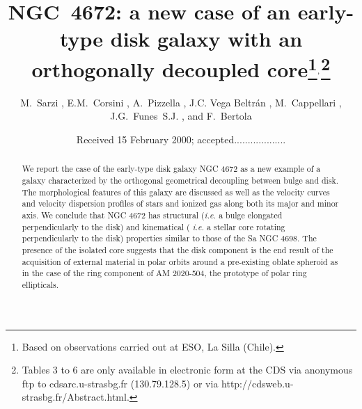 \documentclass[twocolumns]{aa}
\begin{document}

\title{NGC~4672: a new case of an early-type disk
galaxy with an orthogonally decoupled core\thanks{Based on
observations carried out at ESO, La Silla 
(Chile).}$^{\bf,}$\thanks{Tables 3 to 6 are only available in 
electronic form at the CDS via anonymous ftp to cdsarc.u-strasbg.fr 
(130.79.128.5) or via http://cdsweb.u-strasbg.fr/Abstract.html.}}


\subtitle{}

\author{
     M.~Sarzi             ,
     E.M.~Corsini         , 
     A.~Pizzella          ,
     J.C. Vega Beltr\'an  ,
     M.~Cappellari        , 
     J.G.~Funes~S.J.      ,  
     and F.~Bertola       }
	


\date{Received 15 February 2000; accepted...................}



\maketitle

\begin{abstract}

We report the case of the early-type disk gala\-xy NGC 4672 as a new
example of a galaxy characterized by the orthogonal geometrical
decoupling between bulge and disk. The morphological features of this
galaxy are discussed as well as the velocity curves and velocity
dispersion profiles of stars and ionized gas along both its major and
minor axis. We conclude that NGC 4672 has structural ({\it i.e.\/} a
bulge elongated perpendicularly to the disk) and kinematical ({\it
i.e.\/} a stellar core rotating perpendicularly to the disk) properties
similar to those of the Sa NGC 4698. The presence of the isolated
core suggests that the disk component is the end result of the
acquisition of external material in polar orbits around a pre-existing
oblate spheroid as in the case of the ring component of AM 2020-504,
the prototype of polar ring ellipticals.


\end{abstract}
\end{document}
